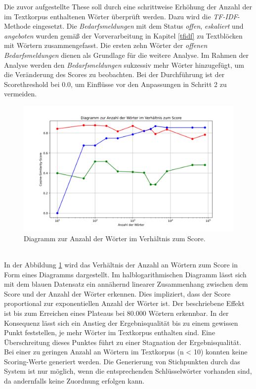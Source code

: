 Die zuvor aufgestellte These soll durch eine schrittweise Erhöhung der Anzahl der im Textkorpus enthaltenen Wörter überprüft werden. Dazu wird die \emph{TF-IDF}-Methode eingesetzt. Die \emph{Bedarfsmeldungen} mit dem Status \emph{offen}, \emph{eskaliert} und \emph{angeboten} wurden gemäß der Vorverarbeitung in Kapitel \ref{tfidf} zu Textblöcken mit Wörtern zusammengefasst. Die ersten zehn Wörter der \emph{offenen Bedarfsmeldungen} dienen als Grundlage für die weitere Analyse. Im Rahmen der Analyse werden den \emph{Bedarfsmeldungen} sukzessiv mehr Wörter hinzugefügt, um die Veränderung des Scores zu beobachten. Bei der Durchführung ist der Scorethreshold bei 0.0, um Einflüsse vor den Anpassungen in Schritt 2 zu vermeiden.
\begin{figure}[H]
	\centering  
	\includegraphics[width=\linewidth]{plot/e1-woerter-score.png}
	\caption{Diagramm zur Anzahl der Wörter im Verhältnis zum Score.}
	\label{fig:woertervsscore}
\end{figure}\mbox{} \\
In der Abbildung \ref{fig:woertervsscore} wird das Verhältnis der Anzahl an Wörtern zum Score in Form eines Diagramms dargestellt. Im halblogarithmischen Diagramm lässt sich mit dem blauen Datensatz ein annähernd linearer Zusammenhang zwischen dem Score und der Anzahl der Wörter erkennen. Dies impliziert, dass der Score proportional zur exponentiellen Anzahl der Wörter ist. Der beschriebene Effekt ist bis zum Erreichen eines Plateaus bei 80.000 Wörtern erkennbar. In der Konsequenz lässt sich ein Anstieg der Ergebnisqualität bis zu einem gewissen Punkt feststellen, je mehr Wörter im Textkorpus enthalten sind. Eine Überschreitung dieses Punktes führt zu einer Stagnation der Ergebnisqualität. Bei einer zu geringen Anzahl an Wörtern im Textkorpus (n < 10) konnten keine Scoring-Werte generiert werden. Die Generierung von Stichpunkten durch das System ist nur möglich, wenn die entsprechenden Schlüsselwörter vorhanden sind, da andernfalls keine Zuordnung erfolgen kann.
